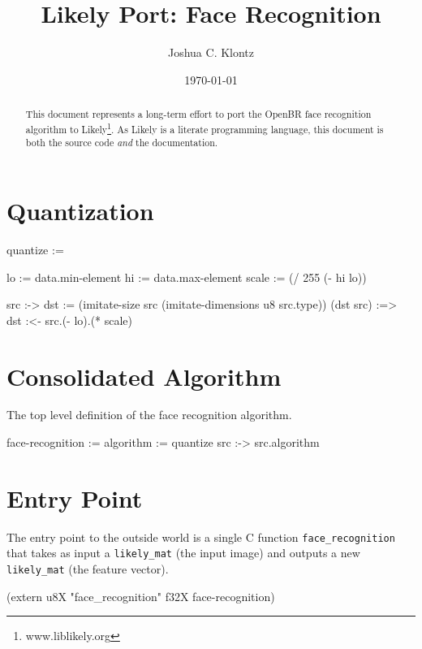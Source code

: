 \documentclass{article}
\title{Likely Port: Face Recognition}
\author{Joshua C. Klontz}
\date{\today}
\newenvironment{likely}
{ \verbatim }
{ \endverbatim }
\begin{document}
\maketitle

\begin{abstract}
This document represents a long-term effort to port the OpenBR face recognition algorithm to Likely\footnote{www.liblikely.org}.
As Likely is a literate programming language, this document is both the source code \emph{and} the documentation.
\end{abstract}

\section{Quantization}
\begin{likely}
quantize :=
{
  lo := data.min-element
  hi := data.max-element
  scale := (/ 255 (- hi lo))

  src :->
  {
    dst := (imitate-size src (imitate-dimensions u8 src.type))
    (dst src) :=>
      dst :<- src.(- lo).(* scale)
  }
}
\end{likely}

\section{Consolidated Algorithm}
The top level definition of the face recognition algorithm.

\begin{likely}
face-recognition :=
{
  algorithm := quantize
  src :->
    src.algorithm
}
\end{likely}

\section{Entry Point}
The entry point to the outside world is a single C function \texttt{face\_recognition} that takes as input a \texttt{likely\_mat} (the input image) and outputs a new \texttt{likely\_mat} (the feature vector).

\begin{likely}
(extern u8X "face_recognition" f32X face-recognition)
\end{likely}
\end{document}
